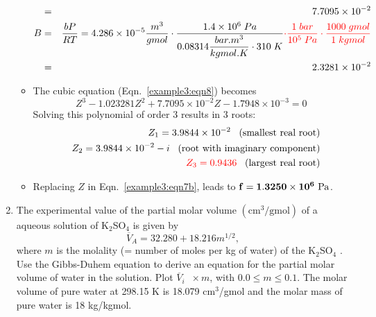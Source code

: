 \documentclass[12pts,a4paper,amsmath,amssymb,floatfix]{article}%
\renewcommand\leq{\leqslant}
\newcommand{\frc}{\displaystyle\frac}
\newcommand{\red}{\textcolor{red}}
\begin{document}
\begin{enumerate}[label=\bfseries Example \arabic*]
\begin{itemize}
\begin{eqnarray}
                &=& 7.7095\times 10^{-2} \nonumber \\
              B &=& \frc{bP}{RT} = 4.286\times 10^{-5} \frc{m^{3}}{gmol}\cdot \frc{1.4\times 10^{6}\;Pa}{0.08314 \frc{bar.m^{3}}{kgmol.K}\cdot 310\;K}\red{\cdot \frc{1\;bar}{10^{5}\;Pa}\cdot\frc{1000\; gmol}{1\; kgmol}} \nonumber \\
                &=& 2.3281\times 10^{-2} \nonumber
           \end{eqnarray}
      \item The cubic equation (Eqn.~\ref{example3:eqn8}) becomes
           \begin{displaymath}
              Z^{3} - 1.023281 Z^{2} + 7.7095\times 10^{-2} Z - 1.7948\times 10^{-3} = 0
           \end{displaymath}
           Solving this polynomial of order 3 results in 3 roots:
           \begin{eqnarray}
               &&Z_{1} = 3.9844\times 10^{-2} \;\;\;\text{(smallest real root)} \nonumber\\
               &&Z_{2} = 3.9844\times 10^{-2} - i \;\;\;\text{(root with imaginary component)} \nonumber\\
               &&\red{Z_{3} = 0.9436} \;\;\;\text{(largest real root)}\nonumber
           \end{eqnarray}
      \item Replacing $Z$ in Eqn.~\ref{example3:eqn7b}, leads to ${\bf f= 1.3250\times 10^{6}\text{ Pa}}$.
   
\end{itemize}

\clearpage

\item\label{Example:4} The experimental value of the partial molar volume $\left(\text{cm}^{3}/\text{gmol}\right)$ of a aqueous solution of K$_{2}$SO$_{4}$ is given by
                \begin{displaymath}
                   \overline{V}_{A} = 32.280 + 18.216 m^{1/2},
                \end{displaymath} 
 where $m$ is the molality (= number of moles per kg of water) of the K$_{2}$SO$_{4}$ . Use the Gibbs-Duhem equation to derive an equation for the partial molar volume of water in the solution. Plot $\overline{V}_{i}\;\;\times m$, with $0.0\leq m\leq 0.1$. The molar volume of pure water at 298.15 K is 18.079 cm$^{3}$/gmol and the molar mass of pure water is 18 kg/kgmol.


\end{enumerate}
\end{document}
